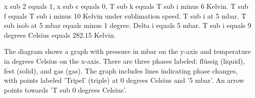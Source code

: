 x sub 2 equals 1, x sub c equals 0, T sub k equals T sub i minus 6 Kelvin. T sub f equals T sub i minus 10 Kelvin under sublimation speed. T sub i at 5 mbar. T sub isob at 5 mbar equals minus 1 degree. Delta i equals 5 mbar. T sub i equals 9 degrees Celsius equals 282.15 Kelvin.

The diagram shows a graph with pressure in mbar on the y-axis and temperature in degrees Celsius on the x-axis. There are three phases labeled: flüssig (liquid), fest (solid), and gas (gas). The graph includes lines indicating phase changes, with points labeled 'Tripel' (triple) at 0 degrees Celsius and '5 mbar'. An arrow points towards 'T sub 0 degrees Celsius'.
